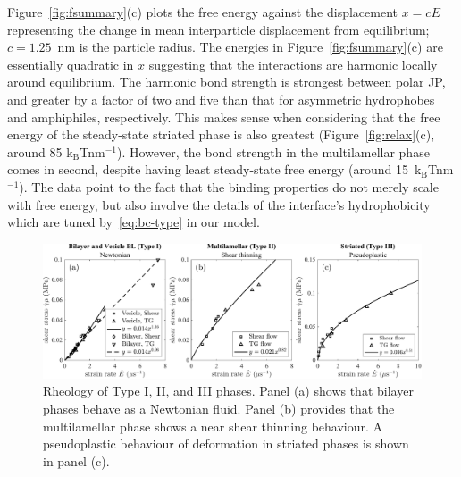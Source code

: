 \documentclass[prb,preprint,showpacs,preprintnumbers,amsmath,amssymb,longbibliography]{revtex4-2}
\newcommand{\KBT}{k$_{\text{B}}$T}
\begin{document}
Figure~\ref{fig:fsummary}(c) plots the free energy against the
displacement $x = c E$ representing the change in mean interparticle
displacement from equilibrium; $c = 1.25$~nm is the particle radius.
The energies in Figure~\ref{fig:fsummary}(c) are essentially quadratic
in $x$ suggesting that the interactions are harmonic locally around
equilibrium. The harmonic bond strength is strongest between polar JP,
and greater by a factor of two and five than that for asymmetric
hydrophobes and amphiphiles, respectively. This makes sense when
considering that the free energy of the steady-state striated phase is
also greatest (Figure~\ref{fig:relax}(c), around 85 \KBT\;nm$^{-1}$).
However, the bond strength in the multilamellar phase comes in second,
despite having least steady-state free energy (around
15~\KBT\;nm$^{-1}$). The data point to the fact that the binding
properties do not merely scale with free energy, but also involve the
details of the interface's hydrophobicity which are tuned
by~\eqref{eq:bc-type} in our model.

\begin{figure}[t]
\begin{center}
\includegraphics[width=\textwidth]{RheologySummary.pdf}
\end{center}
\caption{\label{fig:rheologysummary} Rheology of Type I, II, and III
  phases. Panel (a) shows that bilayer phases behave as a Newtonian
  fluid. Panel (b) provides that the multilamellar phase shows a near
  shear thinning behaviour. A pseudoplastic behaviour of deformation in
  striated phases is shown in panel (c).}
\end{figure}

\end{document}
